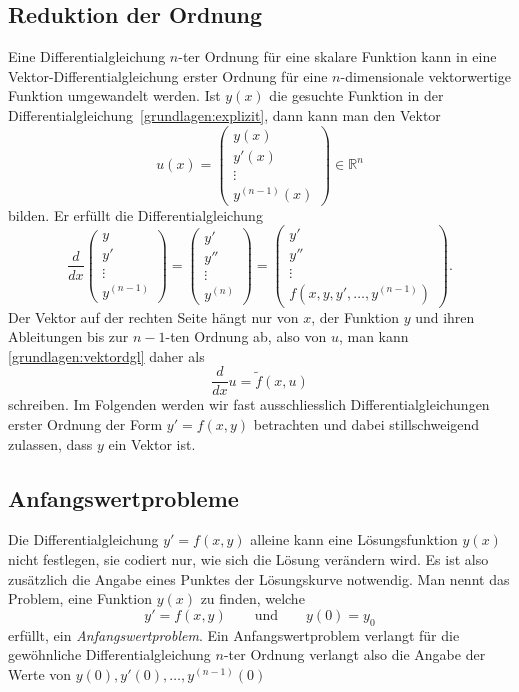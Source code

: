 \subsection{Reduktion der Ordnung}
%
%
Eine Differentialgleichung $n$-ter Ordnung für eine skalare Funktion
kann in eine Vektor-Differen\-tialgleichung erster Ordnung für eine
%
%
$n$-dimensionale vektorwertige Funktion umgewandelt werden.
Ist $y(x)$ die gesuchte Funktion in der
Differentialgleichung~\eqref{grundlagen:explizit}, dann kann man
den Vektor
\[
u(x)=\begin{pmatrix}
y(x)\\y'(x)\\\vdots\\y^{(n-1)}(x)
\end{pmatrix}
\in\mathbb R^n
\]
bilden.
Er erfüllt die Differentialgleichung
\begin{equation}
\frac{d}{dx}\begin{pmatrix}
y\\y'\\\vdots\\y^{(n-1)}
\end{pmatrix}
=
\begin{pmatrix}
y'\\y''\\\vdots\\y^{(n)}
\end{pmatrix}
=
\begin{pmatrix}
y'\\y''\\\vdots\\f(x,y,y',\dots,y^{(n-1)})
\end{pmatrix}.
\label{grundlagen:vektordgl}
\end{equation}
Der Vektor auf der rechten Seite hängt nur von $x$, der Funktion $y$
und ihren Ableitungen bis zur $n-1$-ten Ordnung ab, also von $u$, man
kann \eqref{grundlagen:vektordgl} daher als
\begin{equation}
\frac{d}{dx}u=\tilde{f}(x,u)
\end{equation}
schreiben.
Im Folgenden werden wir fast ausschliesslich Differentialgleichungen
erster Ordnung der Form $y'=f(x,y)$ betrachten und dabei stillschweigend
zulassen, dass $y$ ein Vektor ist.

\subsection{Anfangswertprobleme\label{section:anfangswertprobleme}}
%
Die Differentialgleichung $y'=f(x,y)$ alleine kann eine Lösungsfunktion
$y(x)$ nicht festlegen, sie codiert nur, wie sich die Lösung verändern wird.
Es ist also zusätzlich die Angabe eines Punktes der Lösungskurve
notwendig.
Man nennt das Problem, eine Funktion $y(x)$ zu finden, welche
\[
y'=f(x,y)
\qquad
\text{und}
\qquad
y(0)=y_0
\]
erfüllt, ein {\em Anfangswertproblem}.
Ein Anfangswertproblem verlangt für die gewöhnliche Differentialgleichung
$n$-ter Ordnung verlangt also die Angabe der Werte von
$y(0),y'(0),\dots,y^{(n-1)}(0)$
%

